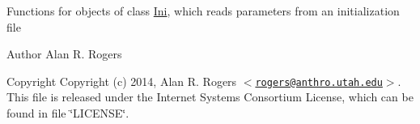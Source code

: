 \-Functions for objects of class \hyperlink{struct_ini}{\-Ini}, which reads parameters from an initialization file

\begin{DoxyAuthor}{\-Author}
\-Alan \-R. \-Rogers 
\end{DoxyAuthor}
\begin{DoxyCopyright}{\-Copyright}
\-Copyright (c) 2014, \-Alan \-R. \-Rogers $<$\href{mailto:rogers@anthro.utah.edu}{\tt rogers@anthro.\-utah.\-edu}$>$. \-This file is released under the \-Internet \-Systems \-Consortium \-License, which can be found in file \char`\"{}\-L\-I\-C\-E\-N\-S\-E\char`\"{}. 
\end{DoxyCopyright}
